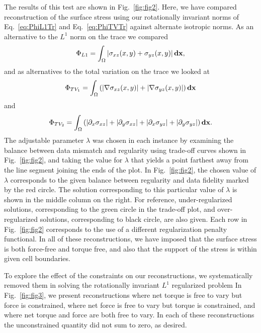 \documentclass[aps,prl,reprint,twocolumn,groupedaddress,showpacs]{revtex4-1}
\def\d{{\bf d}}
\def\x{{\bf x}}
\begin{document}
The results of this test are shown in Fig.~\ref{fig:fig2}. Here, we have compared reconstruction of the surface stress using our rotationally invariant norms of Eq.~\ref{eq:PhiL1Tr} and Eq.~\ref{eq:PhiTVTr} against alternate isotropic norms. As an alternative to the $L^1$ norm on the trace we compared
\begin{equation}
\Phi_{L1} = \int_\Omega \left\vert \sigma_{xz}(x,y) +\sigma_{yz}(x,y) \right\vert\d\x,
\end{equation} 
and as alternatives to the total variation on the trace we looked at
 \begin{equation}
 \Phi_{TV_1} = \int_\Omega \left( \vert\nabla\sigma_{xz}(x,y) \vert + \vert\nabla\sigma_{yz}(x,y) \vert\right)\d\x
 \label{eq:PhiTV1}
\end{equation}
and
\begin{equation}
\Phi_{TV_2} = \int_\Omega  \left( \vert\partial_x\sigma_{xz}\vert + \vert\partial_y\sigma_{xz}\vert + \vert\partial_x\sigma_{yz}\vert+ \vert\partial_y\sigma_{yz}\vert\right)\d\x.
 \label{eq:PhiTV2}
\end{equation}
 The adjustable parameter $\lambda$ was chosen in each instance by examining the balance between data mismatch and regularity using trade-off curves shown in Fig.~\ref{fig:fig2}, and taking the value for $\lambda$ that yields a point farthest away from the line  segment joining the ends of the plot. In Fig.~\ref{fig:fig2}, the chosen value of $\lambda$ corresponds to the given balance between regularity and data fidelity marked by the red circle. The solution corresponding to this particular value of $\lambda$ is shown in the middle column on the right. For reference, under-regularized solutions, corresponding to the green  circle in the trade-off plot, and over-regularized solutions, corresponding to black circle, are also given. Each row in Fig.~\ref{fig:fig2} corresponds to the use of a different regularization penalty functional. In all of these reconstructions, we have imposed that the surface stress is both force-free and torque free, and also that the support of the stress is within given cell boundaries.

To explore the effect of the constraints on our reconstructions, we systematically removed them in solving the rotationally invariant $L^1$ regularized problem In Fig.~\ref{fig:fig3}, we present reconstructions where net torque is free to vary but force is constrained, where net force is free to vary but torque is constrained, and where net torque and force are both free to vary. In each of these reconstructions the unconstrained quantity did not sum to zero, as desired.
\end{document}
